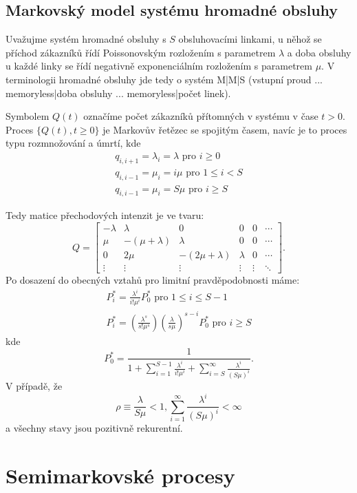 \documentclass[10pt]{article}
\begin{document}
\subsection{Markovský model systému hromadné obsluhy}

Uvažujme systém hromadné obsluhy s $S$ obsluhovacími linkami, u něhož se příchod zákazníků řídí Poissonovským rozložením s parametrem $\lambda$ a doba obsluhy u každé linky se řídí negativně exponenciálním rozložením s parametrem $\mu$. V terminologii hromadné obsluhy jde tedy o systém M|M|S (vstupní proud ... memoryless|doba obsluhy ... memoryless|počet linek).

Symbolem $Q(t)$ označíme počet zákazníků přítomných v systému v čase $t>0$. Proces $\{Q(t),t\geq 0\}$ je Markovův řetězec se spojitým časem, navíc je to proces typu rozmnožování a úmrtí, kde 
\begin{gather*}
q_{i,i+1} = \lambda_i = \lambda \text{ pro } i \geq 0\\
q_{i,i-1} = \mu_i = i \mu \text{ pro }1 \leq i < S\\
q_{i,i-1} = \mu_i = S \mu \text{ pro } i \geq S
\end{gather*}

Tedy matice přechodových intenzit je ve tvaru:
\begin{equation*}
Q = 
\begin{bmatrix}
-\lambda & \lambda &0&0&0&\cdots\\
\mu& -(\mu+\lambda) & \lambda & 0 &0& \cdots\\
0 & 2\mu& -(2\mu+\lambda) & \lambda & 0 & \cdots\\
\vdots&\vdots&\vdots&\vdots&\vdots&\ddots
\end{bmatrix}.
\end{equation*}
Po dosazení do obecných vztahů pro limitní pravděpodobnosti máme:
\begin{gather*}
P_i^* = \frac{\lambda^i}{i!\mu^i}P_0^* \text{ pro } 1 \leq i \leq S-1\\
P_i^* = \left(\frac{\lambda^s}{s! \mu^s} \right) \left(\frac{\lambda}{s \mu} \right)^{s-i} P_0^* \text{ pro } i \geq S
\end{gather*}
kde $$P_0^*= \frac{1}{1+\sum_{i=1}^{S-1}\frac{\lambda^i}{i! \mu^i}+\sum_{i=S}^{\infty}\frac{\lambda^i}{(S \mu)^i} }.$$
V případě, že $$\rho \equiv \frac{\lambda}{S \mu}<1, \sum_{i=1}^\infty \frac{\lambda^i}{(S\mu)^i} < \infty$$ a všechny stavy jsou pozitivně rekurentní.

\section{Semimarkovské procesy}
\end{document}
